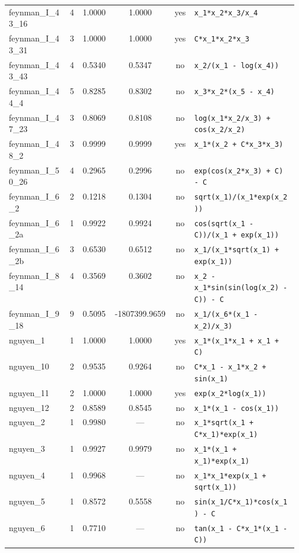 \begin{footnotesize}
\begin{longtable}{p{0.215\linewidth} c c c c p{0.36\linewidth}}
feynman\_I\_43\_16 & 4 & 1.0000 & 1.0000 & yes & \texttt{x\_1*x\_2*x\_3/x\_4} \\
feynman\_I\_43\_31 & 3 & 1.0000 & 1.0000 & yes & \texttt{C*x\_1*x\_2*x\_3} \\
feynman\_I\_43\_43 & 4 & 0.5340 & 0.5347 & no & \texttt{x\_2/(x\_1 - log(x\_4))} \\
feynman\_I\_44\_4 & 5 & 0.8285 & 0.8302 & no & \texttt{x\_3*x\_2*(x\_5 - x\_4)} \\
feynman\_I\_47\_23 & 3 & 0.8069 & 0.8108 & no & \texttt{log(x\_1*x\_2/x\_3) + cos(x\_2/x\_2)} \\
feynman\_I\_48\_2 & 3 & 0.9999 & 0.9999 & yes & \texttt{x\_1*(x\_2 + C*x\_3*x\_3)} \\
feynman\_I\_50\_26 & 4 & 0.2965 & 0.2996 & no & \texttt{exp(cos(x\_2*x\_3) + C) - C} \\
feynman\_I\_6\_2 & 2 & 0.1218 & 0.1304 & no & \texttt{sqrt(x\_1)/(x\_1*exp(x\_2))} \\
feynman\_I\_6\_2a & 1 & 0.9922 & 0.9924 & no & \texttt{cos(sqrt(x\_1 - C))/(x\_1 + exp(x\_1))} \\
feynman\_I\_6\_2b & 3 & 0.6530 & 0.6512 & no & \texttt{x\_1/(x\_1*sqrt(x\_1) + exp(x\_1))} \\
feynman\_I\_8\_14 & 4 & 0.3569 & 0.3602 & no & \texttt{x\_2 - x\_1*sin(sin(log(x\_2) - C)) - C} \\
feynman\_I\_9\_18 & 9 & 0.5095 & -1807399.9659 & no & \texttt{x\_1/(x\_6*(x\_1 - x\_2)/x\_3)} \\
nguyen\_1 & 1 & 1.0000 & 1.0000 & yes & \texttt{x\_1*(x\_1*x\_1 + x\_1 + C)} \\
nguyen\_10 & 2 & 0.9535 & 0.9264 & no & \texttt{C*x\_1 - x\_1*x\_2 + sin(x\_1)} \\
nguyen\_11 & 2 & 1.0000 & 1.0000 & yes & \texttt{exp(x\_2*log(x\_1))} \\
nguyen\_12 & 2 & 0.8589 & 0.8545 & no & \texttt{x\_1*(x\_1 - cos(x\_1))} \\
nguyen\_2 & 1 & 0.9980 & --- & no & \texttt{x\_1*sqrt(x\_1 + C*x\_1)*exp(x\_1)} \\
nguyen\_3 & 1 & 0.9927 & 0.9979 & no & \texttt{x\_1*(x\_1 + x\_1)*exp(x\_1)} \\
nguyen\_4 & 1 & 0.9968 & --- & no & \texttt{x\_1*x\_1*exp(x\_1 + sqrt(x\_1))} \\
nguyen\_5 & 1 & 0.8572 & 0.5558 & no & \texttt{sin(x\_1/C*x\_1)*cos(x\_1) - C} \\
nguyen\_6 & 1 & 0.7710 & --- & no & \texttt{tan(x\_1 - C*x\_1*(x\_1 - C))} \\

\end{longtable}
\end{footnotesize}
